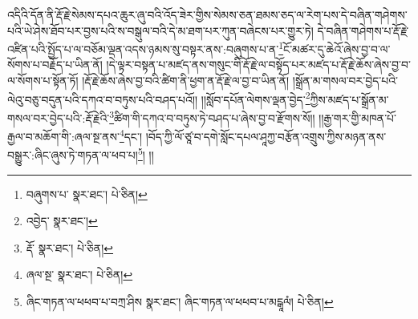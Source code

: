 འདིའི་དོན་ནི་རྡོ་རྗེ་སེམས་དཔའ་ཆུར་ཞུ་བའི་འོད་ཟེར་གྱིས་སེམས་ཅན་ཐམས་ཅད་ལ་རེག་པས་དེ་བཞིན་གཤེགས་པའི་ཡེ་ཤེས་ཐོབ་པར་བྱས་པའི་ས་བསྒུལ་བའི་དེ་མ་ཐག་པར་ཀུན་བཞེངས་པར་གྱུར་ཏེ། དེ་བཞིན་གཤེགས་པ་རྡོ་རྗེ་འཛིན་པའི་སྤྱོད་པ་ལ་བཅོམ་ལྡན་འདས་ཉམས་སུ་བསྟར་ནས་:བཞུགས་པ་ན་\footnote{བཞུགས་པ་  སྣར་ཐང་།  པེ་ཅིན། }ངོ་མཚར་དུ་ཆེའོ་ཞེས་བྱ་བ་ལ་སོགས་པ་བརྗོད་པ་ཡིན་ནོ། །དེ་ལྟར་བསྟན་པ་མཛད་ནས་གསུང་གི་རྡོ་རྗེ་ལ་བསྟོད་པར་མཛད་པ་རྡོ་རྗེ་ཆོས་ཞེས་བྱ་བ་ལ་སོགས་པ་སྟོན་ཏོ། །རྡོ་རྗེ་ཆོས་ཞེས་བྱ་བའི་ཚིག་ནི་ཕྱག་ན་རྡོ་རྗེ་ལ་བྱ་བ་ཡིན་ནོ། །སྒྲོན་མ་གསལ་བར་བྱེད་པའི་ལེའུ་བཅུ་བདུན་པའི་དཀའ་བ་བཏུས་པའི་བཤད་པའོ།། །།སློབ་དཔོན་ལེགས་ལྡན་བྱེད་\footnote{འབྱེད་  སྣར་ཐང་། }ཀྱིས་མཛད་པ་སྒྲོན་མ་གསལ་བར་བྱེད་པའི་:རྡོ་རྗེའི་\footnote{རྡོ་  སྣར་ཐང་།  པེ་ཅིན། }ཚིག་གི་དཀའ་བ་བཏུས་ཏེ་བཤད་པ་ཞེས་བྱ་བ་རྫོགས་སོ།། །།རྒྱ་གར་གྱི་མཁན་པོ་རྒྱལ་བ་མཆོག་གི་:ཞལ་སྔ་ནས་\footnote{ཞལ་སྔ་  སྣར་ཐང་།  པེ་ཅིན། }དང་། །བོད་ཀྱི་ལོ་ཙཱ་བ་དགེ་སློང་དཔལ་ཤཱཀྱ་བརྩོན་འགྲུས་ཀྱིས་མཉན་ནས་བསྒྱུར་:ཞིང་ཞུས་ཏེ་གཏན་ལ་ཕབ་པ།\footnote{ཞིང་གཏན་ལ་ཕཕབ་པ་བཀྲ་ཤིས  སྣར་ཐང་། ཞིང་གཏན་ལ་ཕཕབ་པ་མངྒཱལཾ།  པེ་ཅིན། }། །།